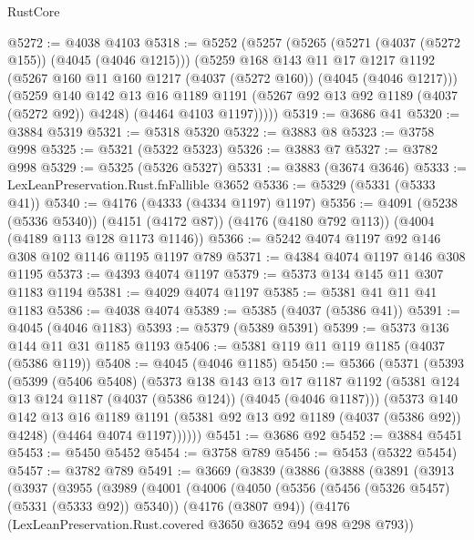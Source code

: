 \begin{lexlean}{RustCore}
\begin{coremodule}
@5272 := @4038 @4103
@5318 := @5252
    (@5257
      (@5265
        (@5271 (@4037 (@5272 @155)) (@4045 (@4046 @1215)))
        (@5259
          @168
          @143
          @11
          @17
          @1217
          @1192
          (@5267 @160 @11 @160 @1217 (@4037 (@5272 @160)) (@4045 (@4046 @1217)))
          (@5259
            @140
            @142
            @13
            @16
            @1189
            @1191
            (@5267 @92 @13 @92 @1189 (@4037 (@5272 @92)) @4248)
            (@4464 @4103 @1197)))))
@5319 := @3686 @41
@5320 := @3884 @5319
@5321 := @5318 @5320
@5322 := @3883 @8
@5323 := @3758 @998
@5325 := @5321 (@5322 @5323)
@5326 := @3883 @7
@5327 := @3782 @998
@5329 := @5325 (@5326 @5327)
@5331 := @3883 (@3674 @3646)
@5333 := LexLeanPreservation.Rust.fnFallible @3652
@5336 := @5329 (@5331 (@5333 @41))
@5340 := @4176 (@4333 (@4334 @1197) @1197)
@5356 := @4091
    (@5238 (@5336 @5340))
    (@4151 (@4172 @87))
    (@4176 (@4180 @792 @113))
    (@4004 (@4189 @113 @128 @1173 @1146))
@5366 := @5242 @4074 @1197 @92 @146 @308 @102 @1146 @1195 @1197 @789
@5371 := @4384 @4074 @1197 @146 @308 @1195
@5373 := @4393 @4074 @1197
@5379 := @5373 @134 @145 @11 @307 @1183 @1194
@5381 := @4029 @4074 @1197
@5385 := @5381 @41 @11 @41 @1183
@5386 := @4038 @4074
@5389 := @5385 (@4037 (@5386 @41))
@5391 := @4045 (@4046 @1183)
@5393 := @5379 (@5389 @5391)
@5399 := @5373 @136 @144 @11 @31 @1185 @1193
@5406 := @5381 @119 @11 @119 @1185 (@4037 (@5386 @119))
@5408 := @4045 (@4046 @1185)
@5450 := @5366
    (@5371
      (@5393
        (@5399
          (@5406 @5408)
          (@5373
            @138
            @143
            @13
            @17
            @1187
            @1192
            (@5381 @124 @13 @124 @1187 (@4037 (@5386 @124)) (@4045 (@4046 @1187)))
            (@5373
              @140
              @142
              @13
              @16
              @1189
              @1191
              (@5381 @92 @13 @92 @1189 (@4037 (@5386 @92)) @4248)
              (@4464 @4074 @1197))))))
@5451 := @3686 @92
@5452 := @3884 @5451
@5453 := @5450 @5452
@5454 := @3758 @789
@5456 := @5453 (@5322 @5454)
@5457 := @3782 @789
@5491 := @3669
    (@3839
      (@3886
        (@3888
          (@3891
            (@3913
              (@3937
                (@3955
                  (@3989
                    (@4001
                      (@4006
                        (@4050
                          (@5356 (@5456 (@5326 @5457) (@5331 (@5333 @92)) @5340))
                          (@4176 (@3807 @94))
                          (@4176 (LexLeanPreservation.Rust.covered @3650 @3652 @94 @98 @298 @793))

\end{coremodule}
\end{lexlean}
